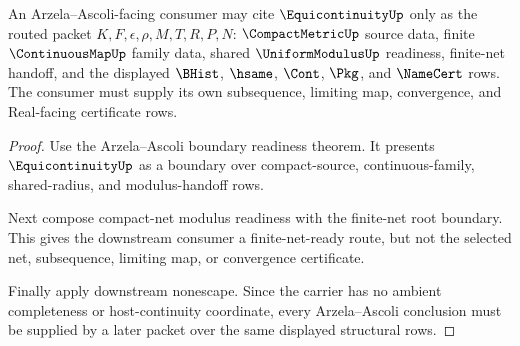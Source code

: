 \begin{theorem}
\label{thm:equicontinuity-arzela-ascoli-consumer-route}
An Arzela--Ascoli-facing consumer may cite $\EquicontinuityUp$ only as the routed packet $K,F,\epsilon,\rho,M,T,R,P,N$: $\CompactMetricUp$ source data, finite $\ContinuousMapUp$ family data, shared $\UniformModulusUp$ readiness, finite-net handoff, and the displayed $\BHist$, $\hsame$, $\Cont$, $\Pkg$, and $\NameCert$ rows. The consumer must supply its own subsequence, limiting map, convergence, and Real-facing certificate rows.
\end{theorem}
\begin{proof}
Use the Arzela--Ascoli boundary readiness theorem. It presents $\EquicontinuityUp$ as a boundary over compact-source, continuous-family, shared-radius, and modulus-handoff rows.

Next compose compact-net modulus readiness with the finite-net root boundary. This gives the downstream consumer a finite-net-ready route, but not the selected net, subsequence, limiting map, or convergence certificate.

Finally apply downstream nonescape. Since the carrier has no ambient completeness or host-continuity coordinate, every Arzela--Ascoli conclusion must be supplied by a later packet over the same displayed structural rows.
\end{proof}


